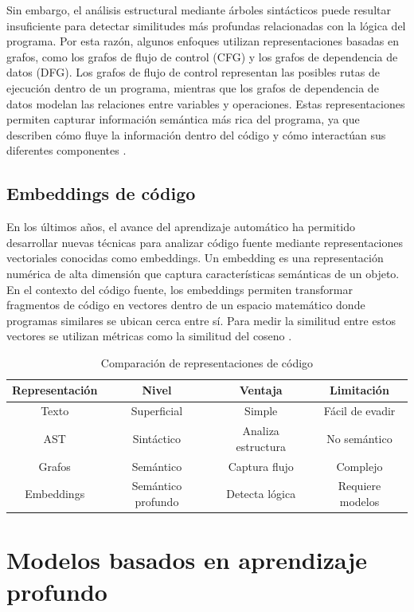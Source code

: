 Sin embargo, el análisis estructural mediante árboles sintácticos puede resultar insuficiente para detectar similitudes más profundas relacionadas con la lógica del programa. Por esta razón, algunos enfoques utilizan representaciones basadas en grafos, como los grafos de flujo de control (CFG) y los grafos de dependencia de datos (DFG). Los grafos de flujo de control representan las posibles rutas de ejecución dentro de un programa, mientras que los grafos de dependencia de datos modelan las relaciones entre variables y operaciones. Estas representaciones permiten capturar información semántica más rica del programa, ya que describen cómo fluye la información dentro del código y cómo interactúan sus diferentes componentes \cite{Yu2023Graph}.

\subsection{Embeddings de código}

En los últimos años, el avance del aprendizaje automático ha permitido desarrollar nuevas técnicas para analizar código fuente mediante representaciones vectoriales conocidas como embeddings. Un embedding es una representación numérica de alta dimensión que captura características semánticas de un objeto. En el contexto del código fuente, los embeddings permiten transformar fragmentos de código en vectores dentro de un espacio matemático donde programas similares se ubican cerca entre sí. Para medir la similitud entre estos vectores se utilizan métricas como la similitud del coseno \cite{Mikolov2013Distributed}.

\begin{table}[H]
\centering
\begin{tabular}{|c|c|c|c|}
\hline
\textbf{Representación} & \textbf{Nivel} & \textbf{Ventaja} & \textbf{Limitación} \\ \hline
Texto & Superficial & Simple & Fácil de evadir \\ \hline
AST & Sintáctico & Analiza estructura & No semántico \\ \hline
Grafos & Semántico & Captura flujo & Complejo \\ \hline
Embeddings & Semántico profundo & Detecta lógica & Requiere modelos \\ \hline
\end{tabular}
\caption{Comparación de representaciones de código}
\end{table}
\section{Modelos basados en aprendizaje profundo}


